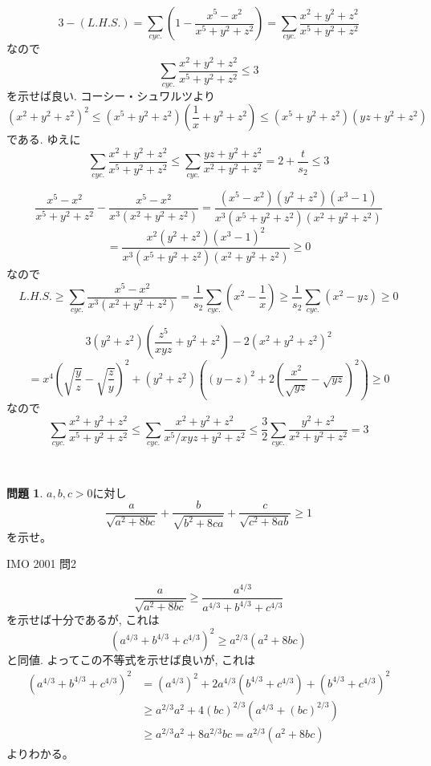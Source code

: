 \documentclass[uplatex, a5paper]{jsarticle}
\makeatletter
\theoremstyle{definition}
\newtheorem{prob}{問題}
\renewenvironment{proof}[1][\proofname]{
  \pushQED{\qed}%
  \normalfont \topsep6\p@\@plus6\p@\relax
  \trivlist
  \item[\hskip\labelsep
    #1\@addpunct{\textbf{.}}]\ignorespaces
}{%
  \popQED\endtrivlist\@endpefalse
}
\providecommand{\proofname}{証明}
\def\qed{\hfill $\Box$}
\makeatother
\begin{document}
\begin{proof}
  \[
  3-(L.H.S.) = \sum_{cyc.} \left( 1- \frac{x^5-x^2}{x^5+y^2+z^2}\right)
  = \sum_{cyc.} \frac{x^2+y^2+z^2}{x^5+y^2+z^2}
  \]
  なので
  \[
  \sum_{cyc.} \frac{x^2+y^2+z^2}{x^5+y^2+z^2} \leq 3
  \]
  を示せば良い.
  コーシー・シュワルツより
  \[
  (x^2+y^2+z^2 )^2
  \leq (x^5+y^2+z^2 ) \left( \frac{1}{x} + y^2+z^2 \right)
  \leq (x^5+y^2+z^2 )(yz+y^2+z^2 )
  \]
  である. ゆえに
  \[
  \sum_{cyc.} \frac{x^2+y^2+z^2}{x^5+y^2+z^2}
  \leq \sum_{cyc.} \frac{yz+y^2+z^2}{x^2+y^2+z^2} = 2 + \frac{t}{s_2}
  \leq 3
  \]
\end{proof}



\begin{proof}
  \[
  \frac{x^5-x^2}{x^5+y^2+z^2} - \frac{x^5-x^2}{x^3(x^2+y^2+z^2)} =
  \frac{(x^5-x^2)(y^2+z^2)(x^3-1)}{x^3(x^5+y^2+z^2)(x^2+y^2+z^2)}
  \]
  \[
  = \frac{x^2(y^2+z^2)(x^3-1)^2}{x^3(x^5+y^2+z^2)(x^2+y^2+z^2)} \geq 0
  \]
  なので
  \[
  L.H.S. \geq \sum_{cyc.} \frac{x^5-x^2}{x^3(x^2+y^2+z^2)} =
  \frac{1}{s_2}\sum_{cyc.}\left( x^2-\frac{1}{x} \right) \geq \frac{1}{s_2}\sum_{cyc.}\left( x^2-yz \right) \geq 0
  \]
\end{proof}


\begin{proof}
  \[
  3(y^2+z^2)\left( \frac{z^5}{xyz} + y^2+z^2 \right) -2(x^2+y^2+z^2)^2
  \]
  \[
  = x^4\left( \sqrt{\frac{y}{z}} -
  \sqrt{\frac{z}{y}} \right) ^2 + (y^2+z^2)\left( (y-z)^2 +
  2\left( \frac{x^2}{\sqrt{yz}} - \sqrt{yz} \right) ^2 \right) \geq 0
  \]
  なので
  \[
  \sum_{cyc.} \frac{x^2+y^2+z^2}{x^5+y^2+z^2} \leq \sum_{cyc.}
  \frac{x^2+y^2+z^2}{x^5/xyz+y^2+z^2} \leq \frac{3}{2}\sum_{cyc.} \frac{y^2+z^2}{x^2+y^2+z^2} = 3
  \]
\end{proof}


\







\newpage

\begin{prob}
  \(a,b,c>0\)に対し
  \[
  \frac{a}{\sqrt{a^2+8bc}} + \frac{b}{\sqrt{b^2+8ca}} + \frac{c}{\sqrt{c^2+8ab}} \geq 1
  \]
  を示せ。
  \begin{flushright}
    IMO 2001 問2
  \end{flushright}
\end{prob}


\begin{proof}
  \[
  \frac{a}{\sqrt{a^2+8bc}} \geq \frac{a^{4/3}}{a^{4/3}+b^{4/3}+c^{4/3}}
  \]
  を示せば十分であるが, これは
  \[
  \left( a^{4/3}+b^{4/3}+c^{4/3} \right) ^2 \geq a^{2/3}(a^2+8bc)
  \]
  と同値.
  よってこの不等式を示せば良いが, これは
  \begin{align*}
    \left( a^{4/3}+b^{4/3}+c^{4/3} \right) ^2
    &= \left( a^{4/3} \right) ^2 + 2a^{4/3}(b^{4/3}+c^{4/3}) + (b^{4/3}+c^{4/3})^2 \\
    &\geq  a^{2/3}a^2 + 4(bc)^{2/3}\left( a^{4/3} + (bc)^{2/3} \right)  \\
    &\geq  a^{2/3}a^2 + 8a^{2/3}bc = a^{2/3}(a^2+8bc)
  \end{align*}
  よりわかる。
\end{proof}
\end{document}
